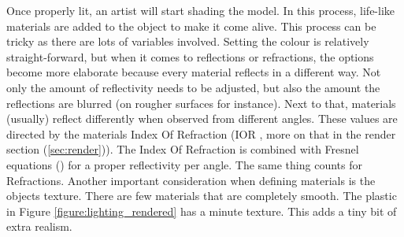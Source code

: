 Once properly lit, an artist will start shading the model. In this process, life-like materials are added to the object to make it come alive. This process can be tricky as there are lots of variables involved. Setting the colour is relatively straight-forward, but when it comes to reflections or refractions, the options become more elaborate because every material reflects in a different way. Not only the amount of reflectivity needs to be adjusted, but also the amount the reflections are blurred (on rougher surfaces for instance). Next to that, materials (usually) reflect differently when observed from different angles. These values are directed by the materials Index Of Refraction (IOR \cite{refractiveIndex}, more on that in the render section (\ref{sec:render})). The Index Of Refraction is combined with Fresnel equations (\cite{fresnelEquations}) for a proper reflectivity per angle. The same thing counts for Refractions.
Another important consideration when defining materials is the objects texture. There are few materials that are completely smooth. The plastic in Figure \ref{figure:lighting_rendered} has a minute texture. This adds a tiny bit of extra realism.


